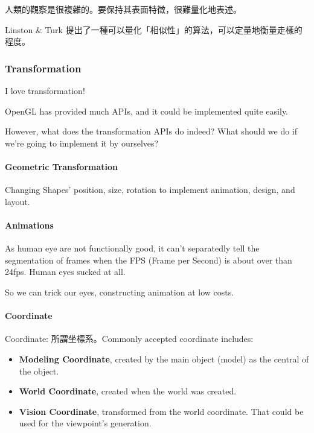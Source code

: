 \documentclass[
]{article}
\begin{document}
人類的觀察是很複雜的。要保持其表面特徵，很難量化地表述。

Linston \& Turk
提出了一種可以量化「相似性」的算法，可以定量地衡量走樣的程度。

\hypertarget{header-n71}{%
\subsubsection{Transformation}\label{header-n71}}

I love transformation!

OpenGL has provided much APIs, and it could be implemented quite easily.

However, what does the transformation APIs do indeed? What should we do
if we're going to implement it by ourselves?

\hypertarget{header-n75}{%
\paragraph{Geometric Transformation}\label{header-n75}}

Changing Shapes' position, size, rotation to implement animation,
design, and layout.

\hypertarget{header-n77}{%
\paragraph{Animations}\label{header-n77}}

As human eye are not functionally good, it can't separatedly tell the
segmentation of frames when the FPS (Frame per Second) is about over
than 24fps. Human eyes sucked at all.

So we can trick our eyes, constructing animation at low costs.

\hypertarget{header-n80}{%
\paragraph{Coordinate}\label{header-n80}}

Coordinate: 所謂坐標系。Commonly accepted coordinate includes:

\begin{itemize}
\item
  \textbf{Modeling Coordinate}, created by the main object (model) as
  the central of the object. 
\item
  \textbf{World Coordinate}, created when the world was created.
\item
  \textbf{Vision Coordinate}, transformed from the world coordinate.
  That could be used for the viewpoint's generation.
\end{itemize}
\end{document}
